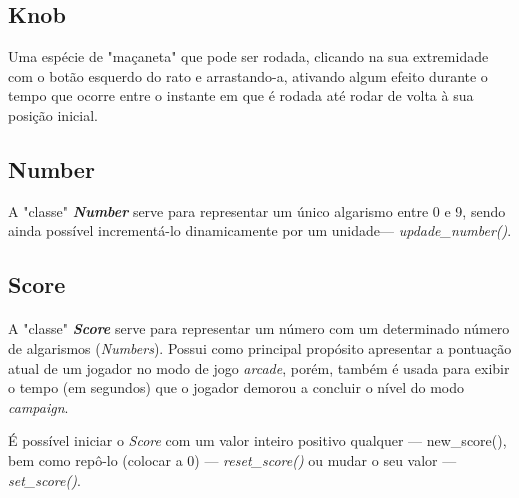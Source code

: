 \documentclass{report}
\begin{document}
\subsection{Knob}

Uma espécie de "maçaneta" que pode ser rodada, clicando na sua extremidade com o botão esquerdo do rato e arrastando-a, ativando algum efeito durante o tempo que ocorre entre o instante em que é rodada até rodar de volta à sua posição inicial.


\subsection{Number}

A "classe" \textbf{\textit{Number}} serve para representar um único algarismo entre 0 e 9, sendo ainda possível incrementá-lo dinamicamente por um unidade\footnotemark --- \textit{updade\_number()}.


\subsection{Score}
\paragraph{}
A "classe" \textbf{\textit{Score}} serve para representar um número com um determinado número de algarismos (\textit{Numbers}). Possui como principal propósito apresentar a pontuação atual de um jogador no modo de jogo \textit{arcade}, porém, também é usada para exibir o tempo (em segundos) que o jogador demorou a concluir o nível do modo \textit{campaign}.

É possível iniciar o \textit{Score} com um valor inteiro positivo qualquer --- new\_score(), bem como repô-lo (colocar a 0) --- \textit{reset\_score()} ou mudar o seu valor --- \textit{set\_score()}. \newline
\end{document}
